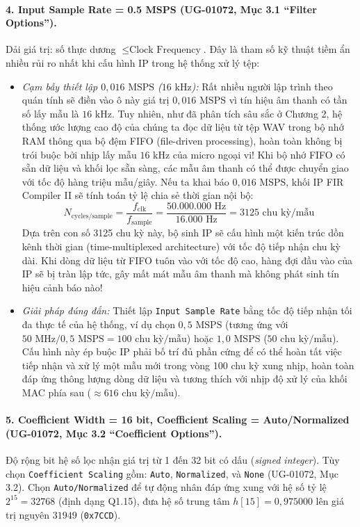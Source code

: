 \paragraph{4. Input Sample Rate = 0.5 MSPS (UG-01072, Mục 3.1 ``Filter Options'').}
Dải giá trị: số thực dương $\le \text{Clock Frequency}$. Đây là tham số kỹ thuật tiềm ẩn nhiều rủi ro nhất khi cấu hình IP trong hệ thống xử lý tệp:
\begin{itemize}[leftmargin=1.5em, itemsep=2pt]
    \item \emph{Cạm bẫy thiết lập $0{,}016\text{ MSPS}$ ($16\text{ kHz}$):} Rất nhiều người lập trình theo quán tính sẽ điền vào ô này giá trị $0{,}016\text{ MSPS}$ vì tín hiệu âm thanh có tần số lấy mẫu là $16\text{ kHz}$. Tuy nhiên, như đã phân tích sâu sắc ở Chương 2, hệ thống ước lượng cao độ của chúng ta đọc dữ liệu từ tệp WAV trong bộ nhớ RAM thông qua bộ đệm FIFO (file-driven processing), hoàn toàn không bị trói buộc bởi nhịp lấy mẫu $16\text{ kHz}$ của micro ngoại vi! Khi bộ nhớ FIFO có sẵn dữ liệu và khối lọc sẵn sàng, các mẫu âm thanh có thể được chuyển giao với tốc độ hàng triệu mẫu/giây. Nếu ta khai báo $0{,}016\text{ MSPS}$, khối IP FIR Compiler II sẽ tính toán tỷ lệ chia sẻ thời gian nội bộ:
    \begin{equation}
    N_{\text{cycles/sample}} = \frac{f_{\text{clk}}}{f_{\text{sample}}} = \frac{50.000.000\text{ Hz}}{16.000\text{ Hz}} = 3125\text{ chu kỳ/mẫu}
    \end{equation}
    Dựa trên con số 3125 chu kỳ này, bộ sinh IP sẽ cấu hình một kiến trúc dồn kênh thời gian (time-multiplexed architecture) với tốc độ tiếp nhận chu kỳ dài. Khi dòng dữ liệu từ FIFO tuôn vào với tốc độ cao, hàng đợi đầu vào của IP sẽ bị tràn lập tức, gây mất mát mẫu âm thanh mà không phát sinh tín hiệu cảnh báo nào!
    \item \emph{Giải pháp đúng đắn:} Thiết lập \texttt{Input Sample Rate} bằng tốc độ tiếp nhận tối đa thực tế của hệ thống, ví dụ chọn $0{,}5\text{ MSPS}$ (tương ứng với $50\text{ MHz} / 0{,}5\text{ MSPS} = 100\text{ chu kỳ/mẫu}$) hoặc $1{,}0\text{ MSPS}$ ($50\text{ chu kỳ/mẫu}$). Cấu hình này ép buộc IP phải bố trí đủ phần cứng để có thể hoàn tất việc tiếp nhận và xử lý một mẫu mới trong vòng 100 chu kỳ xung nhịp, hoàn toàn đáp ứng thông lượng dòng dữ liệu và tương thích với nhịp độ xử lý của khối MAC phía sau ($\approx 616\text{ chu kỳ/mẫu}$).
\end{itemize}

\paragraph{5. Coefficient Width = 16 bit, Coefficient Scaling = Auto/Normalized (UG-01072, Mục 3.2 ``Coefficient Options'').}
Độ rộng bit hệ số lọc nhận giá trị từ 1 đến 32 bit có dấu (\emph{signed integer}). Tùy chọn \texttt{Coefficient Scaling} gồm: \texttt{Auto}, \texttt{Normalized}, và \texttt{None} (UG-01072, Mục 3.2). Chọn \texttt{Auto/Normalized} để tự động nhân đáp ứng xung với hệ số tỷ lệ $2^{15} = 32768$ (định dạng Q1.15), đưa hệ số trung tâm $h[15] = 0{,}975000$ lên giá trị nguyên $31949$ (\texttt{0x7CCD}).

